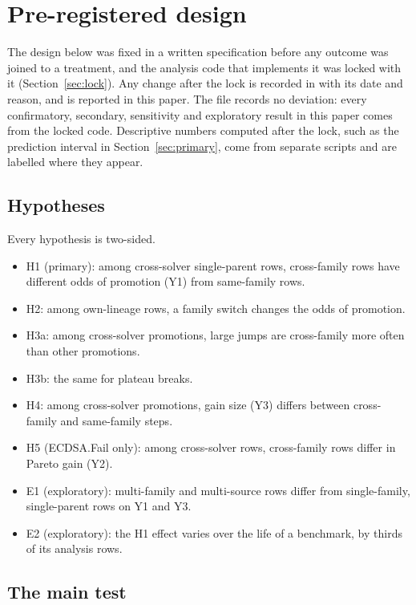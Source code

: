 \section{Pre-registered design}
\label{sec:design}

The design below was fixed in a written specification before any outcome was joined to a treatment, and the analysis code that implements it was locked with it (Section~\ref{sec:lock}).
Any change after the lock is recorded in  with its date and reason, and is reported in this paper.
The file records no deviation: every confirmatory, secondary, sensitivity and exploratory result in this paper comes from the locked code.
Descriptive numbers computed after the lock, such as the prediction interval in Section~\ref{sec:primary}, come from separate scripts and are labelled where they appear.

\subsection{Hypotheses}

Every hypothesis is two-sided.
\begin{itemize}
  \item H1 (primary): among cross-solver single-parent rows, cross-family rows have different odds of promotion (Y1) from same-family rows.
  \item H2: among own-lineage rows, a family switch changes the odds of promotion.
  \item H3a: among cross-solver promotions, large jumps are cross-family more often than other promotions.
  \item H3b: the same for plateau breaks.
  \item H4: among cross-solver promotions, gain size (Y3) differs between cross-family and same-family steps.
  \item H5 (ECDSA.Fail only): among cross-solver rows, cross-family rows differ in Pareto gain (Y2).
  \item E1 (exploratory): multi-family and multi-source rows differ from single-family, single-parent rows on Y1 and Y3.
  \item E2 (exploratory): the H1 effect varies over the life of a benchmark, by thirds of its analysis rows.
\end{itemize}

\subsection{The main test}
\label{sec:model}

